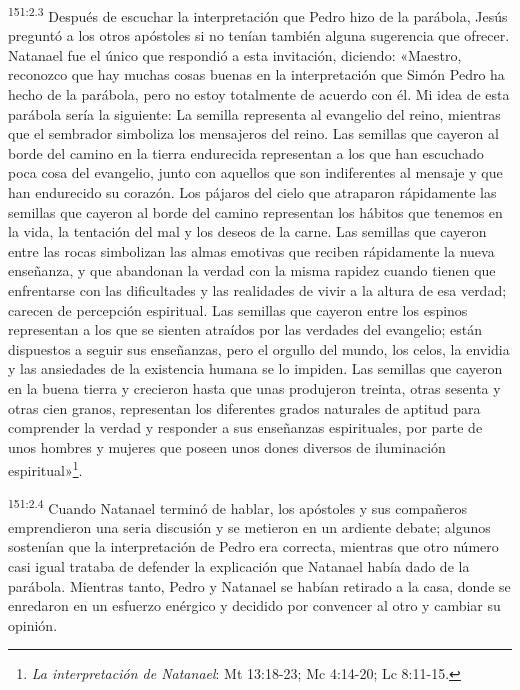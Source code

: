 \par
\textsuperscript{151:2.3} Después de escuchar la interpretación que Pedro hizo de la parábola, Jesús preguntó a los otros apóstoles si no tenían también alguna sugerencia que ofrecer. Natanael fue el único que respondió a esta invitación, diciendo: «Maestro, reconozco que hay muchas cosas buenas en la interpretación que Simón Pedro ha hecho de la parábola, pero no estoy totalmente de acuerdo con él. Mi idea de esta parábola sería la siguiente: La semilla representa al evangelio del reino, mientras que el sembrador simboliza los mensajeros del reino. Las semillas que cayeron al borde del camino en la tierra endurecida representan a los que han escuchado poca cosa del evangelio, junto con aquellos que son indiferentes al mensaje y que han endurecido su corazón. Los pájaros del cielo que atraparon rápidamente las semillas que cayeron al borde del camino representan los hábitos que tenemos en la vida, la tentación del mal y los deseos de la carne. Las semillas que cayeron entre las rocas simbolizan las almas emotivas que reciben rápidamente la nueva enseñanza, y que abandonan la verdad con la misma rapidez cuando tienen que enfrentarse con las dificultades y las realidades de vivir a la altura de esa verdad; carecen de percepción espiritual. Las semillas que cayeron entre los espinos representan a los que se sienten atraídos por las verdades del evangelio; están dispuestos a seguir sus enseñanzas, pero el orgullo del mundo, los celos, la envidia y las ansiedades de la existencia humana se lo impiden. Las semillas que cayeron en la buena tierra y crecieron hasta que unas produjeron treinta, otras sesenta y otras cien granos, representan los diferentes grados naturales de aptitud para comprender la verdad y responder a sus enseñanzas espirituales, por parte de unos hombres y mujeres que poseen unos dones diversos de iluminación espiritual»\footnote{\textit{La interpretación de Natanael}: Mt 13:18-23; Mc 4:14-20; Lc 8:11-15.}.

\par
\textsuperscript{151:2.4} Cuando Natanael terminó de hablar, los apóstoles y sus compañeros emprendieron una seria discusión y se metieron en un ardiente debate; algunos sostenían que la interpretación de Pedro era correcta, mientras que otro número casi igual trataba de defender la explicación que Natanael había dado de la parábola. Mientras tanto, Pedro y Natanael se habían retirado a la casa, donde se enredaron en un esfuerzo enérgico y decidido por convencer al otro y cambiar su opinión.

